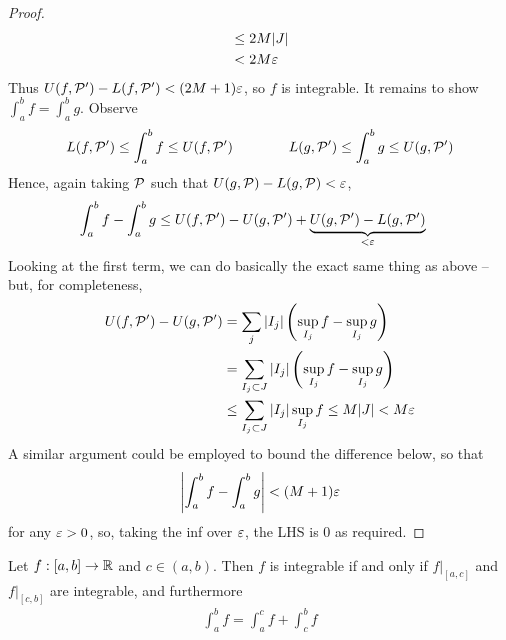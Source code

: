 \documentclass{../template/note}
\begin{document}
\begin{proof}
\begin{align*}
            &\leq 2M |J| \\
            &< 2M\varepsilon
        \end{align*}
        Thus \(U(f, \mathcal{P}') - L(f, \mathcal{P}') < (2M+1)\varepsilon\), so \(f\) is integrable. It remains to show \(\int_a^b f = \int_a^b g\). Observe
        \begin{align*}
            L(f, \mathcal{P}') \leq \int_a^b f \leq U(f, \mathcal{P}') \qquad \qquad L(g, \mathcal{P}') \leq \int_a^b g \leq U(g, \mathcal{P}')
        \end{align*}
        Hence, again taking \(\mathcal{P}\) such that \(U(g, \mathcal{P}) - L(g, \mathcal{P}) < \varepsilon\),
        \begin{align*}
            \int_a^b f - \int_a^b g &\leq U(f, \mathcal{P}') - U(g, \mathcal{P}') + \underbrace{U(g, \mathcal{P}') - L(g, \mathcal{P}')}_{< \varepsilon}
        \end{align*}
        Looking at the first term, we can do basically the exact same thing as above -- but, for completeness,
        \begin{align*}
            U(f, \mathcal{P}') - U(g, \mathcal{P}') &= \sum_j |I_j| \left(\sup_{I_j}f - \sup_{I_j}g\right) \\
            &= \sum_{I_j \subset J} |I_j| \left(\sup_{I_j}f - \sup_{I_j}g\right) \\
            &\leq \sum_{I_j \subset J} |I_j| \sup_{I_j}f 
            \leq M|J| < M\varepsilon
        \end{align*}
        A similar argument could be employed to bound the difference below, so that
        \begin{align*}
            \left|\int_a^b f - \int_a^b g\right| < (M+1)\varepsilon 
        \end{align*}
        for any \(\varepsilon > 0\), so, taking the inf over \(\varepsilon\), the LHS is 0 as required.
    \end{proof}
    

    \begin{proposition}
        \label{additivity-integrals}
        Let \(f: [a, b] \to \mathbb R\) and \(c \in (a, b)\). Then \(f\) is integrable if and only if \(\left.f\right|_{[a,c]}\) and \(\left.f\right|_{[c,b]}\) are integrable, and furthermore
        \begin{align*}
            \int_a^b f = \int_a^c f + \int_c^b f
        \end{align*}
    \end{proposition}
    
\end{document}
